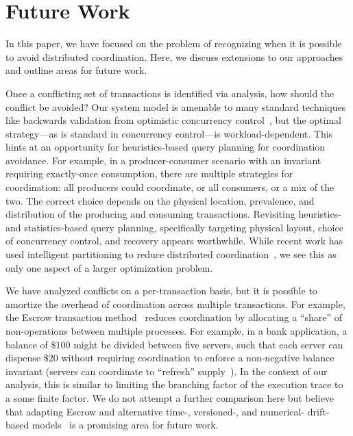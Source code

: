 
\section{Future Work}
\label{sec:discussion}

In this paper, we have focused on the problem of recognizing when it
is possible to avoid distributed coordination. Here, we discuss
extensions to our approaches and outline areas for future work.

 Once a conflicting set of transactions
is identified via \iconfluence analysis, how should the conflict be
avoided? Our system model is amenable to many standard techniques like
backwards validation from optimistic concurrency
control~\cite{bernstein-book,tamer-book}, but the optimal
strategy---as is standard in concurrency control---is
workload-dependent. This hints at an opportunity for heuristics-based
query planning for coordination avoidance. For example, in a
producer-consumer scenario with an invariant requiring exactly-once
consumption, there are multiple strategies for coordination: all
producers could coordinate, or all consumers, or a mix of the two. The
correct choice depends on the physical location, prevalence, and
distribution of the producing and consuming transactions. Revisiting
heuristics- and statistics-based query planning, specifically
targeting physical layout, choice of concurrency control, and recovery
appears worthwhile. While recent work has used intelligent
partitioning to reduce distributed coordination~\cite{schism}, we see
this as only one aspect of a larger optimization problem.

 We have analyzed conflicts on a
per-transaction basis, but it is possible to amortize the overhead of
coordination across multiple transactions. For example, the Escrow
transaction method~\cite{escrow} reduces coordination by allocating a
``share'' of non-\iconfluent operations between multiple
processes. For example, in a bank application, a balance of $\$100$
might be divided between five servers, such that each server can
dispense $\$20$ without requiring coordination to enforce a
non-negative balance invariant (servers can coordinate to ``refresh''
supply~\cite{mdcc}). In the context of our \cfreedom analysis, this is
similar to limiting the branching factor of the execution trace to a
some finite factor. We do not attempt a further comparison here but
believe that adapting Escrow and alternative time-, versioned-, and
numerical- drift-based models~\cite{yu-conit} is a promising area for
future work.

